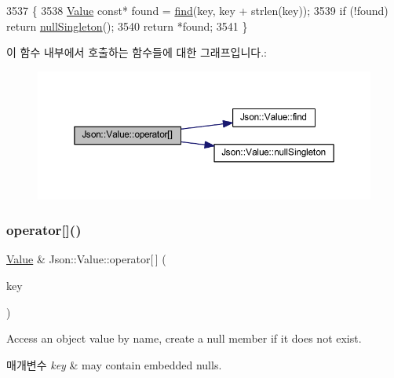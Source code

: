 \begin{DoxyCode}
3537 \{
3538   \hyperlink{class_json_1_1_value}{Value} \textcolor{keyword}{const}* found = \hyperlink{class_json_1_1_value_afb007b9ce9b2cf9d5f667a07e5e0349f}{find}(key, key + strlen(key));
3539   \textcolor{keywordflow}{if} (!found) \textcolor{keywordflow}{return} \hyperlink{class_json_1_1_value_af2f124567acc35d021a424e53ebdfcab}{nullSingleton}();
3540   \textcolor{keywordflow}{return} *found;
3541 \}
\end{DoxyCode}
이 함수 내부에서 호출하는 함수들에 대한 그래프입니다.\+:\nopagebreak
\begin{figure}[H]
\begin{center}
\leavevmode
\includegraphics[width=350pt]{class_json_1_1_value_a1b0498b7b2a520a68137f682d91abdd5_cgraph}
\end{center}
\end{figure}
\mbox{\label{class_json_1_1_value_aedd1e152756a4cc8c1ebac0dd7aeeb78}} 
\subsubsection{\texorpdfstring{operator[]()}{operator[]()}\hspace{0.1cm}{\footnotesize\ttfamily [7/9]}}
{\footnotesize\ttfamily \hyperlink{class_json_1_1_value}{Value} \& Json\+::\+Value\+::operator\mbox{[}$\,$\mbox{]} (\begin{DoxyParamCaption}\item[{const \hyperlink{json_8h_a1e723f95759de062585bc4a8fd3fa4be}{J\+S\+O\+N\+C\+P\+P\+\_\+\+S\+T\+R\+I\+NG} \&}]{key }\end{DoxyParamCaption})}

Access an object value by name, create a null member if it does not exist. 
\begin{DoxyParams}{매개변수}
{\em key} & may contain embedded nulls. \\
\hline
\end{DoxyParams}


